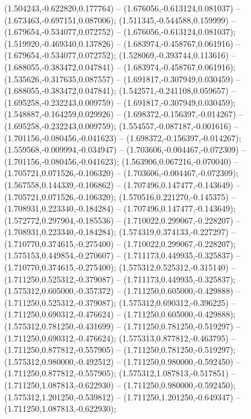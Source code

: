  (1.504243,-0.622820,0.177764) -- (1.676056,-0.613124,0.081037) -- (1.673463,-0.697151,0.087006);
 (1.511345,-0.544588,0.159999) -- (1.679654,-0.534077,0.072752) -- (1.676056,-0.613124,0.081037);
 (1.519920,-0.469340,0.137826) -- (1.683974,-0.458767,0.061916) -- (1.679654,-0.534077,0.072752);
 (1.528069,-0.393744,0.113616) -- (1.688055,-0.383472,0.047841) -- (1.683974,-0.458767,0.061916);
 (1.535626,-0.317635,0.087557) -- (1.691817,-0.307949,0.030459) -- (1.688055,-0.383472,0.047841);
 (1.542571,-0.241108,0.059657) -- (1.695258,-0.232243,0.009759) -- (1.691817,-0.307949,0.030459);
 (1.548887,-0.164259,0.029926) -- (1.698372,-0.156397,-0.014267) -- (1.695258,-0.232243,0.009759);
 (1.554557,-0.087187,-0.001616) -- (1.701156,-0.080456,-0.041623) -- (1.698372,-0.156397,-0.014267);
 (1.559568,-0.009994,-0.034947) -- (1.703606,-0.004467,-0.072309) -- (1.701156,-0.080456,-0.041623);
 (1.563906,0.067216,-0.070040) -- (1.705721,0.071526,-0.106320) -- (1.703606,-0.004467,-0.072309);
 (1.567558,0.144339,-0.106862) -- (1.707496,0.147477,-0.143649) -- (1.705721,0.071526,-0.106320);
 (1.570516,0.221270,-0.145375) -- (1.708931,0.223340,-0.184284) -- (1.707496,0.147477,-0.143649);
 (1.572772,0.297904,-0.185536) -- (1.710022,0.299067,-0.228207) -- (1.708931,0.223340,-0.184284);
 (1.574319,0.374133,-0.227297) -- (1.710770,0.374615,-0.275400) -- (1.710022,0.299067,-0.228207);
 (1.575153,0.449854,-0.270607) -- (1.711173,0.449935,-0.325837) -- (1.710770,0.374615,-0.275400);
 (1.575312,0.525312,-0.315140) -- (1.711250,0.525312,-0.379087) -- (1.711173,0.449935,-0.325837);
 (1.575312,0.605000,-0.357372) -- (1.711250,0.605000,-0.429888) -- (1.711250,0.525312,-0.379087);
 (1.575312,0.690312,-0.396225) -- (1.711250,0.690312,-0.476624) -- (1.711250,0.605000,-0.429888);
 (1.575312,0.781250,-0.431699) -- (1.711250,0.781250,-0.519297) -- (1.711250,0.690312,-0.476624);
 (1.575313,0.877812,-0.463795) -- (1.711250,0.877812,-0.557905) -- (1.711250,0.781250,-0.519297);
 (1.575312,0.980000,-0.492512) -- (1.711250,0.980000,-0.592450) -- (1.711250,0.877812,-0.557905);
 (1.575312,1.087813,-0.517851) -- (1.711250,1.087813,-0.622930) -- (1.711250,0.980000,-0.592450);
 (1.575312,1.201250,-0.539812) -- (1.711250,1.201250,-0.649347) -- (1.711250,1.087813,-0.622930);
